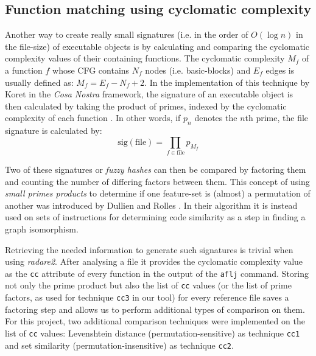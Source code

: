 \documentclass[twocolumn,a4paper]{IEEEtran} %
\begin{document}
\subsection{Function matching using cyclomatic complexity}
\label{sec:tech-cc}
Another way to create really small signatures (i.e. in the order of $O(\log n)$ in the file-size) of executable objects is by calculating and comparing the cyclomatic complexity values of their containing functions. The cyclomatic complexity $M_f$ of a function $f$ whose CFG contains $N_f$ nodes (i.e. basic-blocks) and $E_f$ edges is usually defined as: $M_f = E_f - N_f + 2$. In the implementation of this technique by Koret in the \emph{Cosa Nostra} framework, the signature of an executable object is then calculated by taking the product of primes, indexed by the cyclomatic complexity of each function \cite{Koret2016}. In other words, if $p_n$ denotes the $n$th prime, the file signature is calculated by:
$$ \text{sig}(\text{file}) = \prod_{f \in \text{file}} p_{\scriptscriptstyle M_f}$$

Two of these signatures or \emph{fuzzy hashes} can then be compared by factoring them and counting the number of differing factors between them. This concept of using \emph{small primes products} to determine if one feature-set is (almost) a permutation of another was introduced by Dullien and Rolles \cite{dullien2005graph}. In their algorithm it is instead used on sets of instructions for determining code similarity as a step in finding a graph isomorphism.

Retrieving the needed information to generate such signatures is trivial when using \emph{radare2}. After analysing a file it provides the cyclomatic complexity value as the \texttt{cc} attribute of every function in the output of the \texttt{aflj} command. Storing not only the prime product but also the list of \texttt{cc} values (or the list of prime factors, as used for technique \texttt{cc3} in our tool) for every reference file saves a factoring step and allows us to perform additional types of comparison on them. For this project, two additional comparison techniques were implemented on the list of \texttt{cc} values: Levenshtein distance (permutation-sensitive) as technique \texttt{cc1} and set similarity (permutation-insensitive) as technique \texttt{cc2}.
\end{document}

